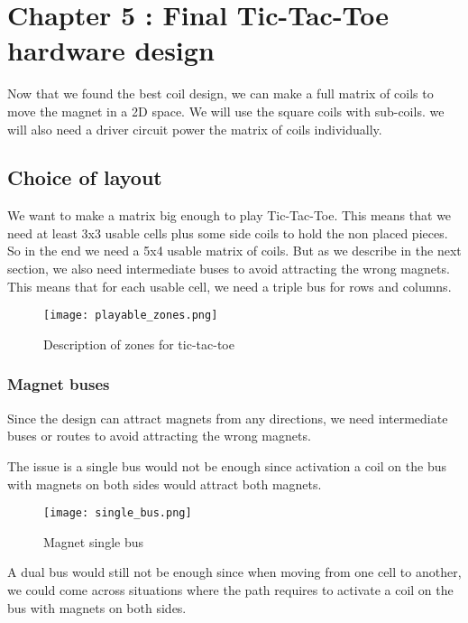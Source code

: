 \chapter{Chapter 5 : Final Tic-Tac-Toe hardware design}

Now that we found the best coil design, we can make a full matrix of coils to move the magnet in a 2D space. We will use the square coils with sub-coils. we will also need a driver circuit power the matrix of coils individually.

\section{Choice of layout}

We want to make a matrix big enough to play Tic-Tac-Toe. This means that we need at least 3x3 usable cells plus some side coils to hold the non placed pieces. So in the end we need a 5x4 usable matrix of coils. But as we describe in the next section, we also need intermediate buses to avoid attracting the wrong magnets. This means that for each usable cell, we need a triple bus for rows and columns.


\begin{figure}[H]
	\centering
	\texttt{[image: playable\_zones.png]}
	\caption[Description of zones for tic-tac-toe]{Description of zones for tic-tac-toe}
	\label{fig:playable_zones}
\end{figure}


\subsection{Magnet buses}

Since the design can attract magnets from any directions, we need intermediate buses or routes to avoid attracting the wrong magnets.

The issue is a single bus would not be enough since activation a coil on the bus with magnets on both sides would attract both magnets.

\begin{figure}[H]
	\centering
	\texttt{[image: single\_bus.png]}
	\caption[Magnet single bus]{Magnet single bus}
	\label{fig:single_bus}
\end{figure}

\newpage

A dual bus would still not be enough since when moving from one cell to another, we could come across situations where the path requires to activate a coil on the bus with magnets on both sides.

